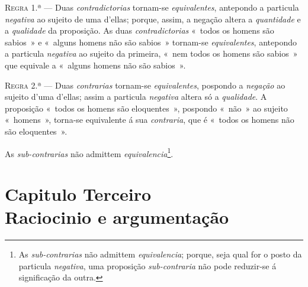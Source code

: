 \ifdefined\pg\else{}\fi


\textsc{Regra} 1.ª --- Duas \emph{contradictorias} tornam-se \emph{equivalentes},
antepondo a particula \emph{negativa} ao sujeito de uma d'ellas; porque, assim, a negação
altera a \emph{quantidade} e a \emph{qualidade} da proposição. As duas
\emph{contradictorias} «~todos os homens são sabios~» e «~alguns homens não são sabios~»
tornam-se \emph{equivalentes}, antepondo a particula \emph{negativa} ao sujeito da
primeira, «~nem todos os homens são sabios~» que equivale a «~alguns homens não são
sabios~».

\textsc{Regra} 2.ª --- Duas \emph{contrarias} tornam-se \emph{equivalentes}, pospondo a
\emph{negação} ao sujeito d'uma d'ellas; assim a particula \emph{negativa} altera só a
\emph{qualidade}. A proposição «~todos os homens são eloquentes~», pospondo «~não~» ao
sujeito «~homens~», torna-se equivalente á sua \emph{contraria}, que é «~todos os homens
não são eloquentes~».

As \emph{sub-contrarias} não admittem \emph{equivalencia}\footnote{As
\emph{sub-contrarias} não admittem \emph{equivalencia}; porque, seja qual for o posto da
particula \emph{negativa}, uma proposição \emph{sub-contraria} não pode reduzir-se á
significação da outra.}.

\chapter*{Capitulo Terceiro\\[0.3em]\large Raciocinio e argumentação}

